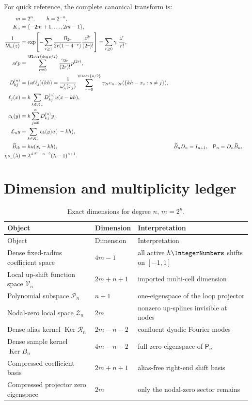 \documentclass[11pt,oneside]{article}
\numberwithin{equation}{section}
\theoremstyle{definition}
\theoremstyle{remark}
\newcommand{\Ker}{\operatorname{Ker}}
\newcommand{\PiN}{\mathcal P}
\newcommand{\App}{\mathscr A}
\newcommand{\MGF}{\mathsf M}
\newcommand{\Rec}{\mathcal L}
\newcommand{\Synth}{\mathcal R}
\newcommand{\Proj}{\mathsf P}
\begin{document}
For quick reference, the complete canonical transform is:
\begin{align}
 m&=2^n,\qquad h=2^{-n},
 \label{eq:sheet-scale}\\
 K_n&=\{-2m+1,\ldots,2m-1\},
 \label{eq:sheet-grid}\\
 \frac1{\MGF_u(z)}
 &=\exp\!\left[-\sum_{r\ge1}
   \frac{B_{2r}}{2r(1-4^{-r})}\frac{z^{2r}}{(2r)!}\right]
 =\sum_{r\ge0}\gamma_r\frac{z^r}{r!},
 \label{eq:sheet-gamma}\\
 \App p&=\sum_{r=0}^{\Floor{\deg p/2}}
 \frac{\gamma_{2r}}{(2r)!}p^{(2r)},
 \label{eq:sheet-App}\\
 D_{kj}^{(n)}&=(\App\ell_j)(kh)
 =\frac1{\omega_n'(x_j)}
   \sum_{r=0}^{\Floor{n/2}}\gamma_{2r}
   e_{n-2r}(\{kh-x_s:s\ne j\}),
 \label{eq:sheet-D}\\
 \ell_j(x)&=h\sum_{k\in K_n}D_{kj}^{(n)}u(x-kh),
 \label{eq:sheet-cardinal}\\
 c_k(y)&=h\sum_{j=0}^{n}D_{kj}^{(n)}y_j,
 \label{eq:sheet-c}\\
 \Rec_ny&=\sum_{k\in K_n}c_k(y)u(\cdot-kh),
 \label{eq:sheet-loop}\\
 \widetilde B_{ik}&=hu(x_i-kh),
 &\widetilde B_nD_n&=I_{n+1},
 &\Proj_n&=D_n\widetilde B_n,
 \label{eq:sheet-matrices}\\
 \chi_{\Proj_n}(\lambda)
 &=\lambda^{4\cdot2^n-n-2}(\lambda-1)^{n+1}.
 \label{eq:sheet-spectrum}
\end{align}

\section{Dimension and multiplicity ledger}
\label{app:ledger}

\begin{longtable}{@{}p{}p{}p{}@{}}
\caption{Exact dimensions for degree $n$, $m=2^n$.}\label{tab:dimension-ledger}\\
\toprule
Object & Dimension & Interpretation \\
\midrule
\endfirsthead
\toprule
Object & Dimension & Interpretation \\
\midrule
\endhead
Dense fixed-radius coefficient space & $4m-1$ & all active $h\IntegerNumbers$ shifts on $[-1,1]$ \\
Local up-shift function space $\mathcal V_n$ & $2m+n+1$ & imported multi-cell dimension \\
Polynomial subspace $\PiN_n$ & $n+1$ & one-eigenspace of the loop projector \\
Nodal-zero local space $\mathcal Z_n$ & $2m$ & nonzero up-splines invisible at nodes \\
Dense alias kernel $\Ker\Synth_n$ & $2m-n-2$ & confluent dyadic Fourier modes \\
Dense sample kernel $\Ker B_n$ & $4m-n-2$ & full zero-eigenspace of $\Proj_n$ \\
Compressed coefficient basis & $2m+n+1$ & alias-free right-end shift basis \\
Compressed projector zero eigenspace & $2m$ & only the nodal-zero sector remains \\
\bottomrule
\end{longtable}
\end{document}
